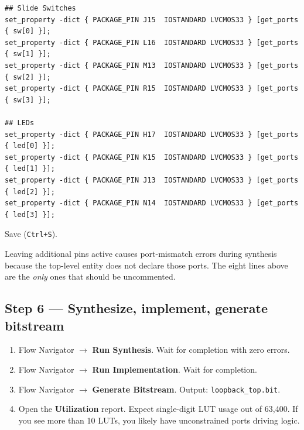 \documentclass[11pt,letterpaper]{article}
\begin{document}
\begin{lstlisting}[caption={Active constraint lines for the switch-to-LED loopback. Copy these exact \texttt{set\_property} statements into your \texttt{.xdc}.}]
## Slide Switches
set_property -dict { PACKAGE_PIN J15  IOSTANDARD LVCMOS33 } [get_ports { sw[0] }];
set_property -dict { PACKAGE_PIN L16  IOSTANDARD LVCMOS33 } [get_ports { sw[1] }];
set_property -dict { PACKAGE_PIN M13  IOSTANDARD LVCMOS33 } [get_ports { sw[2] }];
set_property -dict { PACKAGE_PIN R15  IOSTANDARD LVCMOS33 } [get_ports { sw[3] }];

## LEDs
set_property -dict { PACKAGE_PIN H17  IOSTANDARD LVCMOS33 } [get_ports { led[0] }];
set_property -dict { PACKAGE_PIN K15  IOSTANDARD LVCMOS33 } [get_ports { led[1] }];
set_property -dict { PACKAGE_PIN J13  IOSTANDARD LVCMOS33 } [get_ports { led[2] }];
set_property -dict { PACKAGE_PIN N14  IOSTANDARD LVCMOS33 } [get_ports { led[3] }];
\end{lstlisting}

Save (\texttt{Ctrl+S}).

\begin{tcolorbox}[warning={Do not uncomment extra pins}]
	Leaving additional pins active causes port-mismatch errors during synthesis because the top-level entity does not declare those ports. The eight lines above are the \emph{only} ones that should be uncommented.
\end{tcolorbox}

\newpage
\subsection{Step 6 --- Synthesize, implement, generate bitstream}
\begin{enumerate}[leftmargin=2em]
	\item Flow Navigator $\to$ \textbf{Run Synthesis}. Wait for completion with zero errors.
	\item Flow Navigator $\to$ \textbf{Run Implementation}. Wait for completion.
	\item Flow Navigator $\to$ \textbf{Generate Bitstream}. Output: \texttt{loopback\_top.bit}.
	\item Open the \textbf{Utilization} report. Expect single-digit \mbox{LUT} usage out of 63{,}400. If you see more than 10 LUTs, you likely have unconstrained ports driving logic.
\end{enumerate}
\end{document}
